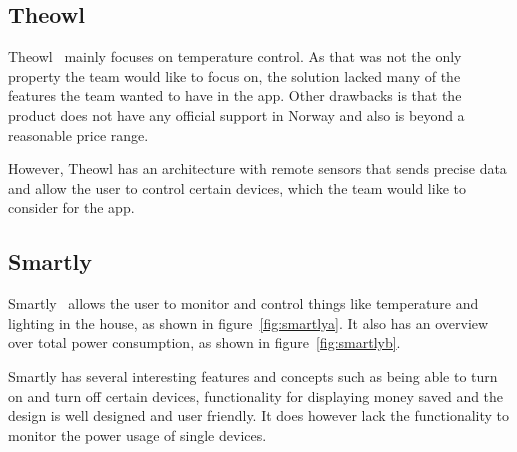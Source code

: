 \subsection{Theowl}

Theowl~\cite{theowl} mainly focuses on temperature control. 
As that was not the only property the team would like to focus on, the solution lacked many of the features the team wanted to have in the app. Other drawbacks is that the product does not have any official support in Norway and also is beyond a reasonable price range. 

However, Theowl has an architecture with remote sensors that sends precise data and allow the user to control certain devices, which the team would like to consider for the app.


\subsection{Smartly}

Smartly~\cite{smartly} allows the user to monitor and control things like temperature and lighting in the house, as shown in figure~\ref{fig:smartlya}. It also has an overview over total power consumption, as shown in figure~\ref{fig:smartlyb}.

Smartly has several interesting features and concepts such as being able to turn on and turn off certain devices, functionality for displaying money saved and the design is well designed and user friendly. It does however lack the functionality to monitor the power usage of single devices.

